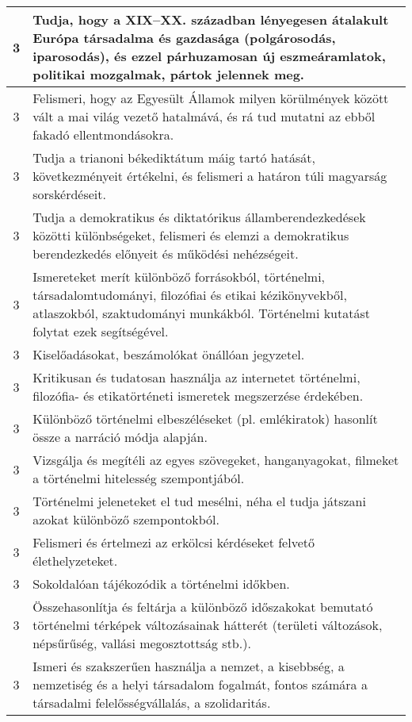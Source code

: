 \begin{longtable}{c | p{12cm} }
                                          3 &  Tudja, hogy a XIX–XX. században lényegesen átalakult Európa társadalma és gazdasága (polgárosodás, iparosodás), és ezzel párhuzamosan új eszmeáramlatok, politikai mozgalmak, pártok jelennek meg. \\ \hline
                                          3 &  Felismeri, hogy az Egyesült Államok milyen körülmények között vált a mai világ vezető hatalmává, és rá tud mutatni az ebből fakadó ellentmondásokra. \\ \hline
                                          3 &  Tudja a trianoni békediktátum máig tartó hatását, következményeit értékelni, és felismeri a határon túli magyarság sorskérdéseit. \\ \hline
                                          3 &  Tudja a demokratikus és diktatórikus államberendezkedések közötti különbségeket, felismeri és elemzi a demokratikus berendezkedés előnyeit és működési nehézségeit. \\ \hline
                                          3 &  Ismereteket merít különböző forrásokból, történelmi, társadalomtudományi, filozófiai és etikai kézikönyvekből, atlaszokból, szaktudományi munkákból. Történelmi kutatást folytat ezek segítségével. \\ \hline
                                          3 &  Kiselőadásokat, beszámolókat önállóan jegyzetel. \\ \hline
                                          3 &  Kritikusan és tudatosan használja az internetet történelmi, filozófia- és etikatörténeti ismeretek megszerzése érdekében. \\ \hline
                                          3 &  Különböző történelmi elbeszéléseket (pl. emlékiratok) hasonlít össze a narráció módja alapján. \\ \hline
                                          3 &  Vizsgálja és megítéli az egyes szövegeket, hanganyagokat, filmeket a történelmi hitelesség szempontjából. \\ \hline
                                          3 &  Történelmi jeleneteket el tud mesélni, néha el tudja játszani azokat különböző szempontokból. \\ \hline
                                          3 &  Felismeri és értelmezi az erkölcsi kérdéseket felvető élethelyzeteket. \\ \hline
                                          3 &  Sokoldalóan tájékozódik a történelmi időkben. \\ \hline
                                          3 &  Összehasonlítja és feltárja a különböző időszakokat bemutató történelmi térképek változásainak hátterét (területi változások, népsűrűség, vallási megosztottság stb.). \\ \hline
                                          3 &  Ismeri és szakszerűen használja a nemzet, a kisebbség, a nemzetiség és a helyi társadalom fogalmát, fontos számára a társadalmi felelősségvállalás, a szolidaritás. \\ \hline
                                      

\end{longtable}
